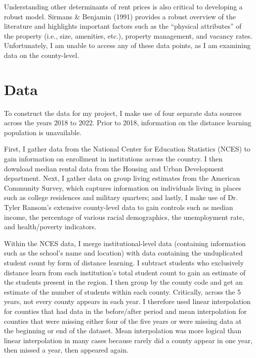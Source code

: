 \documentclass[12pt,english]{article}
\begin{document}
Understanding other determinants of rent prices is also critical to developing a robust model. Sirmans \& Benjamin (1991) provides a robust overview of the literature and highlights important factors such as the “physical attributes” of the property (i.e., size, amenities, etc.), property management, and vacancy rates. Unfortunately, I am unable to access any of these data points, as I am examining data on the county-level. 

\section{Data}\label{sec:data}
To construct the data for my project, I make use of four separate data sources across the years 2018 to 2022. Prior to 2018, information on the distance learning population is unavailable.

First, I gather data from the National Center for Education Statistics (NCES) to gain information on enrollment in institutions across the country. I then download median rental data from the Housing and Urban Development department. Next, I gather data on group living estimates from the American Community Survey, which captures information on individuals living in places such as college residences and military quarters; and lastly, I make use of Dr. Tyler Ransom’s extensive county-level data to gain controls such as median income, the percentage of various racial demographics, the unemployment rate, and health/poverty indicators. 

Within the NCES data, I merge institutional-level data (containing information such as the school's name and location) with data containing the unduplicated student count by form of distance learning. I subtract students who exclusively distance learn from each institution’s total student count to gain an estimate of the students present in the region. I then group by the county code and get an estimate of the number of students within each county. Critically, across the 5 years, not every county appears in each year. I therefore used linear interpolation for counties that had data in the before/after period and mean interpolation for counties that were missing either four of the five years or were missing data at the beginning or end of the dataset. Mean interpolation was more logical than linear interpolation in many cases because rarely did a county appear in one year, then missed a year, then appeared again. 
\end{document}
